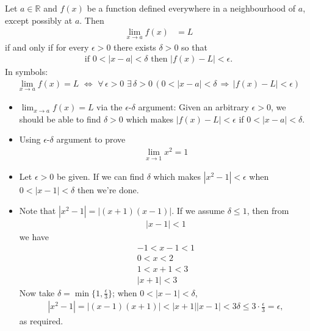\section{}\label{sec opt formal limit}
\begin{defn}\label{def_1_7_1}
Let $a \in \mathbb{R}$ and %
$f(x)$ be a function defined everywhere in a neighbourhood of $a$, except possibly at $a$. %
Then
\begin{align*}
\lim_{x \to a} f(x) &= L
\end{align*}
if and only if for every $\epsilon >0$ there exists $\delta>0$ so that
\begin{align*}
\text{if } 0 < |x-a| < \delta \text{ then } |f(x) - L| <\epsilon.
\end{align*}
In symbols:
\begin{align*}
\lim_{x \to a} f(x) = L\,\,\Longleftrightarrow\,\,\forall\,\epsilon > 0\,\,\exists\,\delta > 0\,(0 < |x - a| < \delta\,\Longrightarrow\,|f(x) - L| < \epsilon)
\end{align*}
\end{defn}
\begin{itemize}
\item $\lim_{x \to a} f(x) = L$ via the $\epsilon$-$\delta$ argument: Given an arbitrary $\epsilon > 0$, we should be able to find $\delta > 0$ which makes $|f(x) - L|< \epsilon$ if $0 < |x - a| < \delta$.
\end{itemize}
\begin{itemize}
\item Using $\epsilon$-$\delta$ argument to prove
\begin{align*}
\lim_{x\to 1}x^2 = 1
\end{align*}
\item
Let $\epsilon > 0$ be given. If we can find $\delta$ which makes $|x^2 - 1| < \epsilon$ when $0 < |x - 1| < \delta$ then we're done.
\item Note that $|x^2 - 1| = |(x + 1)(x - 1)|$. If we assume $\delta\leqslant 1$, then from
\begin{align*}
|x - 1| < 1
\end{align*}
we have
\begin{gather*}
-1 < x - 1 < 1 \\
0 < x < 2 \\
1 < x + 1 < 3 \\
|x + 1| < 3
\end{gather*}
Now take $\delta = \min\{1, \frac{\epsilon}{3}\}$; when $0 < |x - 1| < \delta$,
\begin{align*}
|x^2 - 1| = |(x - 1)(x + 1)| < |x + 1||x - 1| < 3\delta \leqslant 3\cdot\frac{\epsilon}{3}= \epsilon,
\end{align*}
as required.
\end{itemize}
